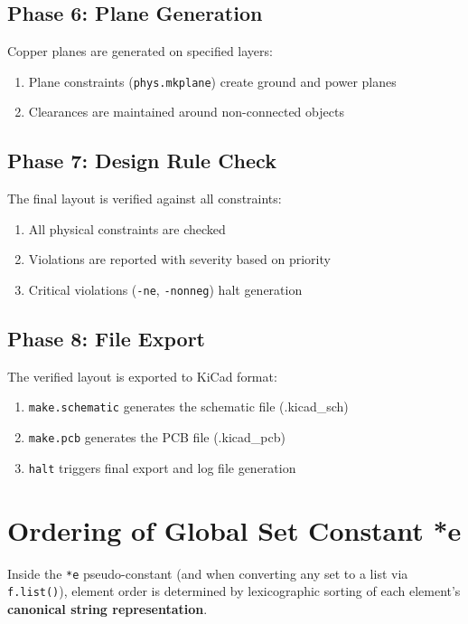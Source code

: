 \subsection{Phase 6: Plane Generation}
Copper planes are generated on specified layers:
\begin{enumerate}
\item Plane constraints (\texttt{phys.mkplane}) create ground and power planes
\item Clearances are maintained around non-connected objects
\end{enumerate}

\subsection{Phase 7: Design Rule Check}
The final layout is verified against all constraints:
\begin{enumerate}
\item All physical constraints are checked
\item Violations are reported with severity based on priority
\item Critical violations (\texttt{-ne}, \texttt{-nonneg}) halt generation
\end{enumerate}

\subsection{Phase 8: File Export}
The verified layout is exported to KiCad format:
\begin{enumerate}
\item \texttt{make.schematic} generates the schematic file (.kicad\_sch)
\item \texttt{make.pcb} generates the PCB file (.kicad\_pcb)
\item \texttt{halt} triggers final export and log file generation
\end{enumerate}

\section{Ordering of Global Set Constant *e}
Inside the \texttt{*e} pseudo-constant (and when converting any set to a list via \texttt{f.list()}), element order is determined by lexicographic sorting of each element's \textbf{canonical string representation}.


